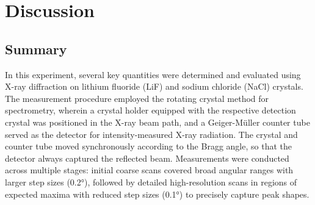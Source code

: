 \chapter{Discussion}
\label{ch:Diskussion}

\section{Summary}
\label{sec:Zusammenfassung}
In this experiment, several key quantities were determined and evaluated using X-ray diffraction on lithium fluoride (LiF) and sodium chloride (NaCl) crystals. The measurement procedure employed the rotating crystal method for spectrometry, wherein a crystal holder equipped with the respective detection crystal was positioned in the X-ray beam path, and a Geiger-Müller counter tube served as the detector for intensity-measured X-ray radiation. The crystal and counter tube moved synchronously according to the Bragg angle, so that the detector always captured the reflected beam. Measurements were conducted across multiple stages: initial coarse scans covered broad angular ranges with larger step sizes (0.2°), followed by detailed high-resolution scans in regions of expected maxima with reduced step sizes (0.1°) to precisely capture peak shapes.

